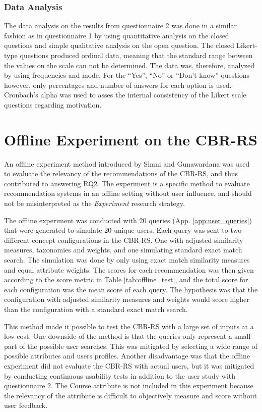 \subsubsection{Data Analysis}
The data analysis on the results from questionnaire 2 was done in a similar fashion as in questionnaire 1 by using quantitative analysis on the closed questions and simple qualitative analysis on the open question. The closed Likert-type questions produced ordinal data, meaning that the standard range between the values on the scale can not be determined. The data was, therefore, analyzed by using frequencies and mode. For the \enquote{Yes}, \enquote{No} or \enquote{Don't know} questions however, only percentages and number of answers for each option is used. Cronbach's alpha was used to asses the internal consistency of the Likert scale questions regarding motivation. 

\section{Offline Experiment on the CBR-RS}\label{sec:observation_test}

An offline experiment method introduced by Shani and Gunawardana \cite{shani2011evaluating} was used to evaluate the relevancy of the recommendations of the CBR-RS, and thus contributed to answering RQ2. The experiment is a specific method to evaluate recommendation systems in an offline setting without user influence, and should not be misinterpreted as the \textit{Experiment} research strategy.

The offline experiment was conducted with 20 queries (App. \ref{app:user_queries}) that were generated to simulate 20 unique users. Each query was sent to two different concept configurations in the CBR-RS. One with adjusted similarity measures, taxonomies and weights, and one simulating standard exact match search. The simulation was done by only using exact match similarity measures and equal attribute weights. The scores for each recommendation was then given according to the score metric in Table \ref{tab:offline_test}, and the total score for each configuration was the mean score of each query. The hypothesis was that the configuration with adjusted similarity measures and weights would score higher than the configuration with a standard exact match search. 

This method made it possible to test the CBR-RS with a large set of inputs at a low cost. One downside of the method is that the queries only represent a small part of the possible user searches. This was mitigated by selecting a wide range of possible attributes and users profiles. Another disadvantage was that the offline experiment did not evaluate the CBR-RS with actual users, but it was mitigated by conducting continuous usability tests in addition to the user study with questionnaire 2. The Course attribute is not included in this experiment because the relevancy of the attribute is difficult to objectively measure and score without user feedback.


